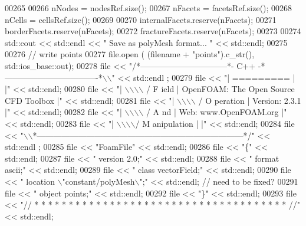 \begin{DoxyCode}
00265 
00266     nNodes = nodesRef.size();
00267     nFacets = facetsRef.size();
00268     nCells = cellsRef.size();
00269 
00270     internalFacets.reserve(nFacets);
00271     borderFacets.reserve(nFacets);
00272     fractureFacets.reserve(nFacets);
00273 
00274     std::cout << std::endl << \textcolor{stringliteral}{" Save as polyMesh format... "} << std::endl;
00275 
00276     \textcolor{comment}{// write points}
00277     file.open ( (filename + \textcolor{stringliteral}{"points"}).c\_str(), std::ios\_base::out);
00278     file << \textcolor{stringliteral}{"/*--------------------------------*- C++ -*----------------------------------*\(\backslash\)\(\backslash\)"} << std::endl
      ;
00279     file << \textcolor{stringliteral}{"| =========                 |                                                 |"} << std::endl;
00280     file << \textcolor{stringliteral}{"| \(\backslash\)\(\backslash\)\(\backslash\)\(\backslash\)      /  F ield         | OpenFOAM: The Open Source CFD Toolbox           |"} << 
      std::endl;
00281     file << \textcolor{stringliteral}{"|  \(\backslash\)\(\backslash\)\(\backslash\)\(\backslash\)    /   O peration     | Version:  2.3.1                                 |"} << 
      std::endl;
00282     file << \textcolor{stringliteral}{"|   \(\backslash\)\(\backslash\)\(\backslash\)\(\backslash\)  /    A nd           | Web:      www.OpenFOAM.org                      |"} << 
      std::endl;
00283     file << \textcolor{stringliteral}{"|    \(\backslash\)\(\backslash\)\(\backslash\)\(\backslash\)/     M anipulation  |                                                 |"} << 
      std::endl;
00284     file << \textcolor{stringliteral}{"\(\backslash\)\(\backslash\)*---------------------------------------------------------------------------*/"} << std::endl
      ;
00285     file << \textcolor{stringliteral}{"FoamFile"} << std::endl;
00286     file << \textcolor{stringliteral}{"\{"} << std::endl;
00287     file << \textcolor{stringliteral}{"    version     2.0;"} << std::endl;
00288     file << \textcolor{stringliteral}{"    format      ascii;"} << std::endl;
00289     file << \textcolor{stringliteral}{"    class       vectorField;"} << std::endl;
00290     file << \textcolor{stringliteral}{"    location    \(\backslash\)"constant/polyMesh\(\backslash\)";"} << std::endl; \textcolor{comment}{// need to be fixed?}
00291     file << \textcolor{stringliteral}{"    object      points;"} << std::endl;
00292     file << \textcolor{stringliteral}{"\}"} << std::endl;
00293     file << \textcolor{stringliteral}{"// * * * * * * * * * * * * * * * * * * * * * * * * * * * * * * * * * * * * * //"} << std::endl;

\end{DoxyCode}
